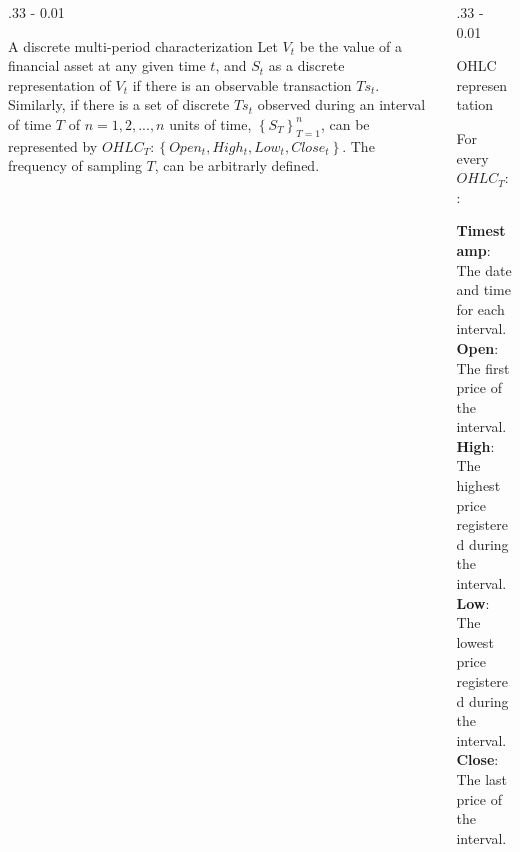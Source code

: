 \documentclass{postertheme}\usepackage[]{graphicx}\usepackage[]{color}
\begin{document}
\begin{frame}
\begin{columns}[onlytextwidth]
\begin{column}{.33 \textwidth - 0.01 \textwidth}
\begin{block}{A discrete multi-period characterization}
      Let $V_{t}$ be the value of a financial asset at any given time $t$, and $S_{t}$ as a discrete 
      representation of $V_{t}$ if there is an observable transaction $Ts_{t}$. Similarly, if there is 
      a set of discrete $Ts_{t}$ observed during an interval of time $T$ of $n = 1, 2, ... , n$ units of time, 
      $\left\{ S_{T} \right\}_{T=1}^{n}$, can be represented by
      $OHLC_{T}: \left\{ Open_{t}, High_{t}, Low_{t}, Close_{t} \right\}$. The frequency of sampling $T$,
      can be arbitrarly defined. 
      
    \end{block}
  \end{column}
  
  \begin{column}{.33 \textwidth - 0.01 \textwidth}
  \begin{block}{OHLC representation}
  
      For every $OHLC_{T}: \left\{ Open_{t}, High_{t}, Low_{t}, Close_{t} \right\}$:
      
      \textbf{Timestamp}: The date and time for each interval. \\
      \textbf{Open}: The first price of the interval. \\
      \textbf{High}: The highest price registered during the interval. \\
      \textbf{Low}: The lowest price registered during the interval. \\
      \textbf{Close}: The last price of the interval.

  \end{block}
  \end{column}


\end{columns}
\end{frame}
\end{document}
